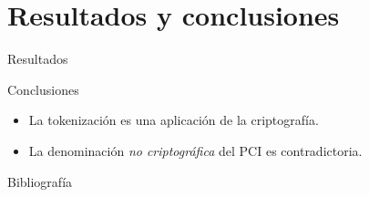 \documentclass{beamer}
\begin{document}
  \section{Resultados y conclusiones}

  \begin{frame}{Resultados}
    \begin{figure}[H]
    \centering
    \end{figure}
  \end{frame}

  \begin{frame}{Conclusiones}
    \begin{itemize}
      \item La tokenización es una aplicación de la criptografía.
      \item La denominación \textit{no criptográfica} del PCI es contradictoria.
    \end{itemize}
  \end{frame}

  \begin{frame}[allowframebreaks]{Bibliografía}
    \printbibliography
  \end{frame}

  \setlength{\parskip}{0.0em}

  {
  \frame{\titlepage}}
\end{document}
